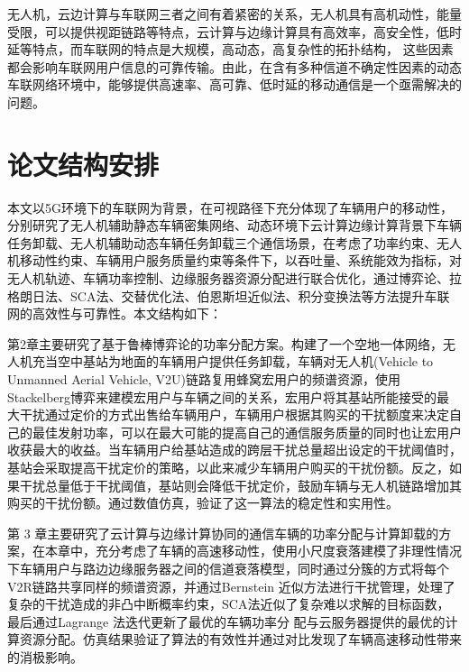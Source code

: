 \textcolor[RGB]{202,12,22}{}
无人机，云边计算与车联网三者之间有着紧密的关系，无人机具有高机动性，能量受限，可以提供视距链路等特点，云计算与边缘计算具有高效率，高安全性，低时延等特点，而车联网的特点是大规模，高动态，高复杂性的拓扑结构，
这些因素都会影响车联网用户信息的可靠传输。由此，在含有多种信道不确定性因素的动态车联网络环境中，能够提供高速率、高可靠、低时延的移动通信是一个亟需解决的问题。

\section{论文结构安排}\label{section1-4}
本文以5G环境下的车联网为背景，在可视路径下充分体现了车辆用户的移动性，分别研究了无人机辅助静态车辆密集网络、动态环境下云计算边缘计算背景下车辆任务卸载、无人机辅助动态车辆任务卸载三个通信场景，在考虑了功率约束、无人机移动性约束、车辆用户服务质量约束等条件下，以吞吐量、系统能效为指标，对无人机轨迹、车辆功率控制、边缘服务器资源分配进行联合优化，通过博弈论、拉格朗日法、SCA法、交替优化法、伯恩斯坦近似法、积分变换法等方法提升车联网的高效性与可靠性。本文结构如下：

第2章主要研究了基于鲁棒博弈论的功率分配方案。构建了一个空地一体网络，无人机充当空中基站为地面的车辆用户提供任务卸载，车辆对无人机(Vehicle to Unmanned Aerial Vehicle, V2U)链路复用蜂窝宏用户的频谱资源，使用Stackelberg博弈来建模宏用户与车辆之间的关系，宏用户将其基站所能接受的最大干扰通过定价的方式出售给车辆用户，车辆用户根据其购买的干扰额度来决定自己的最佳发射功率，可以在最大可能的提高自己的通信服务质量的同时也让宏用户收获最大的收益。当车辆用户给基站造成的跨层干扰总量超出设定的干扰阈值时，基站会采取提高干扰定价的策略，以此来减少车辆用户购买的干扰份额。反之，如果干扰总量低于干扰阈值，基站则会降低干扰定价，鼓励车辆与无人机链路增加其购买的干扰份额。通过数值仿真，验证了这一算法的稳定性和实用性。

第 3 章主要研究了云计算与边缘计算协同的通信车辆的功率分配与计算卸载的方案，在本章中，充分考虑了车辆的高速移动性，使用小尺度衰落建模了非理性情况下车辆用户与路边边缘服务器之间的信道衰落模型，同时通过分簇的方式将每个V2R链路共享同样的频谱资源，并通过Bernstein 近似方法进行干扰管理，处理了复杂的干扰造成的非凸中断概率约束，SCA法近似了复杂难以求解的目标函数，最后通过Lagrange 法迭代更新了最优的车辆功率分
配与云服务器提供的最优的计算资源分配。仿真结果验证了算法的有效性并通过对比发现了车辆高速移动性带来的消极影响。

